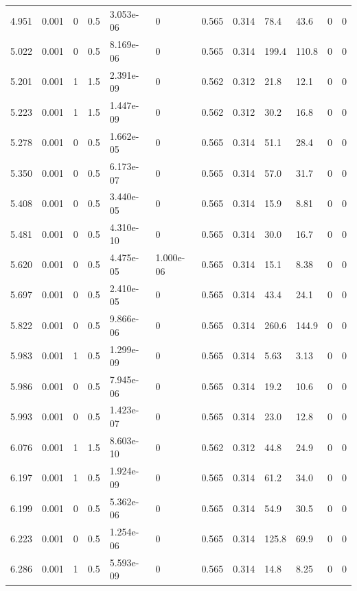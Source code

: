 \documentclass[preview]{standalone}
\begin{document}
{{{\begin{tabular}{L{1.2cm}C{1.2cm} C{0.3cm}C{0.5cm} C{1.4cm}C{1.4cm} C{1.4cm}C{1.4cm} C{1.6cm}C{1.6cm} C{1.6cm}C{1.6cm}}
  4.951  &  0.001  & 0     & 0.5 &  3.053e-06  & 0  &  0.565&   0.314& 78.4 & 43.6   &  0 & 0  \\ 
  5.022  &  0.001  & 0     & 0.5 &  8.169e-06  & 0  &  0.565&   0.314& 199.4 & 110.8   &  0 & 0  \\ 
  5.201  &  0.001  & 1     & 1.5 &  2.391e-09  & 0  &  0.562&   0.312& 21.8 & 12.1   &  0 & 0  \\ 
  5.223  &  0.001  & 1     & 1.5 &  1.447e-09  & 0  &  0.562&   0.312& 30.2 & 16.8   &  0 & 0  \\ 
  5.278  &  0.001  & 0     & 0.5 &  1.662e-05  & 0  &  0.565&   0.314& 51.1 & 28.4   &  0 & 0  \\ 
  5.350  &  0.001  & 0     & 0.5 &  6.173e-07  & 0  &  0.565&   0.314& 57.0 & 31.7   &  0 & 0  \\ 
  5.408  &  0.001  & 0     & 0.5 &  3.440e-05  & 0  &  0.565&   0.314& 15.9 & 8.81   &  0 & 0  \\ 
  5.481  &  0.001  & 0     & 0.5 &  4.310e-10  & 0  &  0.565&   0.314& 30.0 & 16.7   &  0 & 0  \\ 
  5.620  &  0.001  & 0     & 0.5 &  4.475e-05  & 1.000e-06  &  0.565&   0.314& 15.1 & 8.38   &  0 & 0  \\ 
  5.697  &  0.001  & 0     & 0.5 &  2.410e-05  & 0  &  0.565&   0.314& 43.4 & 24.1   &  0 & 0  \\ 
  5.822  &  0.001  & 0     & 0.5 &  9.866e-06  & 0  &  0.565&   0.314& 260.6 & 144.9   &  0 & 0  \\ 
  5.983  &  0.001  & 1     & 0.5 &  1.299e-09  & 0  &  0.565&   0.314& 5.63 & 3.13   &  0 & 0  \\ 
  5.986  &  0.001  & 0     & 0.5 &  7.945e-06  & 0  &  0.565&   0.314& 19.2 & 10.6   &  0 & 0  \\ 
  5.993  &  0.001  & 0     & 0.5 &  1.423e-07  & 0  &  0.565&   0.314& 23.0 & 12.8   &  0 & 0  \\ 
  6.076  &  0.001  & 1     & 1.5 &  8.603e-10  & 0  &  0.562&   0.312& 44.8 & 24.9   &  0 & 0  \\ 
  6.197  &  0.001  & 1     & 0.5 &  1.924e-09  & 0  &  0.565&   0.314& 61.2 & 34.0   &  0 & 0  \\ 
  6.199  &  0.001  & 0     & 0.5 &  5.362e-06  & 0  &  0.565&   0.314& 54.9 & 30.5   &  0 & 0  \\ 
  6.223  &  0.001  & 0     & 0.5 &  1.254e-06  & 0  &  0.565&   0.314& 125.8 & 69.9   &  0 & 0  \\ 
  6.286  &  0.001  & 1     & 0.5 &  5.593e-09  & 0  &  0.565&   0.314& 14.8 & 8.25   &  0 & 0  \\ 

\end{tabular}}}}
\end{document}

